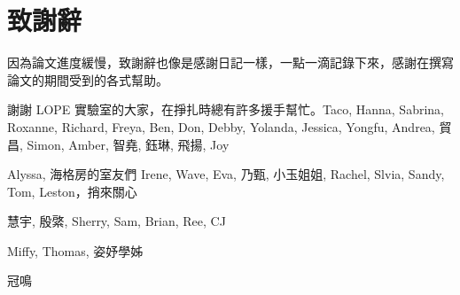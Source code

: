 

\chapter*{致謝辭}
因為論文進度緩慢，致謝辭也像是感謝日記一樣，一點一滴記錄下來，感謝在撰寫論文的期間受到的各式幫助。


謝謝 LOPE 實驗室的大家，在掙扎時總有許多援手幫忙。Taco, Hanna, Sabrina, Roxanne, Richard, Freya, Ben, Don, Debby, Yolanda, Jessica, Yongfu, Andrea, 貿昌, Simon, Amber, 智堯, 鈺琳, 飛揚, Joy

Alyssa, 海格房的室友們 Irene, Wave, Eva, 乃甄, 小玉姐姐, Rachel, Slvia, Sandy, Tom, Leston，捎來關心

慧宇, 殷綮, Sherry, Sam, Brian, Ree, CJ

Miffy, Thomas, 姿妤學姊

冠鳴

